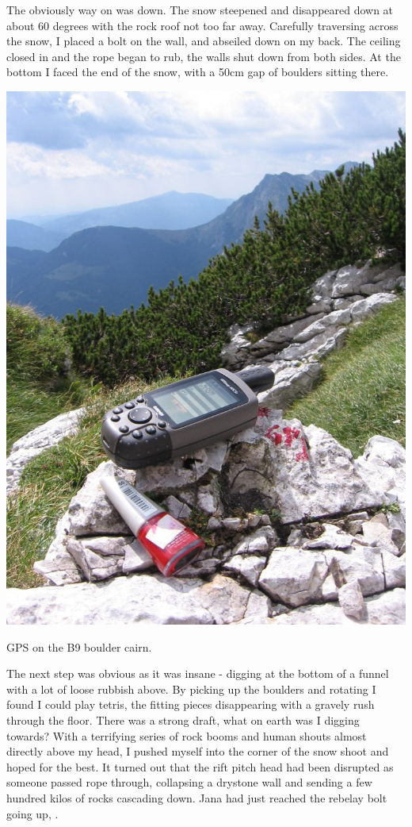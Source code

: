 The obviously way on was down. The snow steepened and
disappeared down at about 60 degrees with the rock roof not too far
away. Carefully traversing across the snow, I placed a bolt on the wall,
and abseiled down on my back. The ceiling closed in and the rope began
to rub, the walls shut down from both sides. At the bottom I faced the
end of the snow, with a 50cm gap of boulders sitting there.

\begin{marginfigure}
\checkoddpage \ifoddpage \forcerectofloat \else \forceversofloat \fi
\centering
 \includegraphics[width=\linewidth]{2007/b9/jarvist frost - b9 boulder cairn gps--orig.jpg} 
 \caption{GPS on the B9 boulder cairn. }
\end{marginfigure}


The next step was obvious as it was insane - digging at the bottom of a
funnel with a lot of loose rubbish above. By picking up the boulders and
rotating I found I could play tetris, the fitting pieces disappearing
with a gravely rush through the floor. There was a strong draft, what on
earth was I digging towards? With a terrifying series of rock booms and
human shouts almost directly above my head, I pushed myself into the
corner of the snow shoot and hoped for the best. It turned out that the
rift pitch head had been disrupted as someone passed rope through,
collapsing a drystone wall and sending a few hundred kilos of rocks
cascading down. Jana had just reached the rebelay bolt going up,
.


